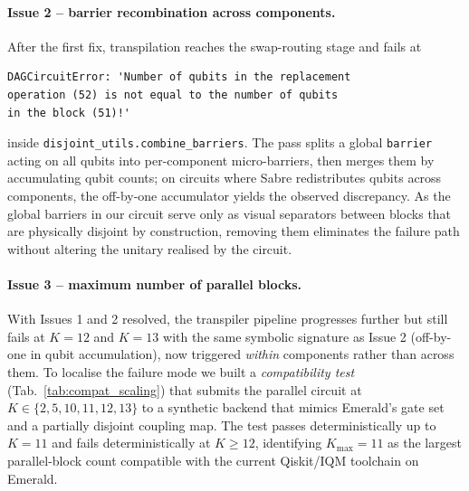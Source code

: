 \paragraph{Issue 2 -- barrier recombination across components.}
After the first fix, transpilation reaches the swap-routing stage and fails at
\begin{verbatim}
DAGCircuitError: 'Number of qubits in the replacement
operation (52) is not equal to the number of qubits
in the block (51)!'
\end{verbatim}
inside \texttt{disjoint\_utils.combine\_barriers}. The pass splits a global \texttt{barrier} acting on all qubits into per-component micro-barriers, then merges them by accumulating qubit counts; on circuits where Sabre redistributes qubits across components, the off-by-one accumulator yields the observed discrepancy. As the global barriers in our circuit serve only as visual separators between blocks that are physically disjoint by construction, removing them eliminates the failure path without altering the unitary realised by the circuit.

\paragraph{Issue 3 -- maximum number of parallel blocks.}
With Issues 1 and 2 resolved, the transpiler pipeline progresses further but still fails at $K=12$ and $K=13$ with the same symbolic signature as Issue 2 (off-by-one in qubit accumulation), now triggered \emph{within} components rather than across them. To localise the failure mode we built a \emph{compatibility test} (Tab.~\ref{tab:compat_scaling}) that submits the parallel circuit at $K\in\{2,5,10,11,12,13\}$ to a synthetic backend that mimics Emerald's gate set and a partially disjoint coupling map. The test passes deterministically up to $K=11$ and fails deterministically at $K\geq 12$, identifying $K_{\max}=11$ as the largest parallel-block count compatible with the current Qiskit/IQM toolchain on Emerald.

